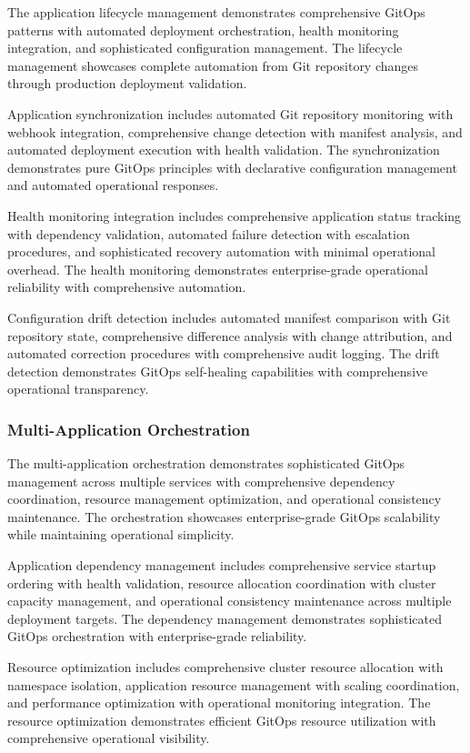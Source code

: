 The application lifecycle management demonstrates comprehensive GitOps patterns with automated deployment orchestration, health monitoring integration, and sophisticated configuration management. The lifecycle management showcases complete automation from Git repository changes through production deployment validation.

Application synchronization includes automated Git repository monitoring with webhook integration, comprehensive change detection with manifest analysis, and automated deployment execution with health validation. The synchronization demonstrates pure GitOps principles with declarative configuration management and automated operational responses.

Health monitoring integration includes comprehensive application status tracking with dependency validation, automated failure detection with escalation procedures, and sophisticated recovery automation with minimal operational overhead. The health monitoring demonstrates enterprise-grade operational reliability with comprehensive automation.

Configuration drift detection includes automated manifest comparison with Git repository state, comprehensive difference analysis with change attribution, and automated correction procedures with comprehensive audit logging. The drift detection demonstrates GitOps self-healing capabilities with comprehensive operational transparency.

\subsubsection{Multi-Application Orchestration}

The multi-application orchestration demonstrates sophisticated GitOps management across multiple services with comprehensive dependency coordination, resource management optimization, and operational consistency maintenance. The orchestration showcases enterprise-grade GitOps scalability while maintaining operational simplicity.

Application dependency management includes comprehensive service startup ordering with health validation, resource allocation coordination with cluster capacity management, and operational consistency maintenance across multiple deployment targets. The dependency management demonstrates sophisticated GitOps orchestration with enterprise-grade reliability.

Resource optimization includes comprehensive cluster resource allocation with namespace isolation, application resource management with scaling coordination, and performance optimization with operational monitoring integration. The resource optimization demonstrates efficient GitOps resource utilization with comprehensive operational visibility.

